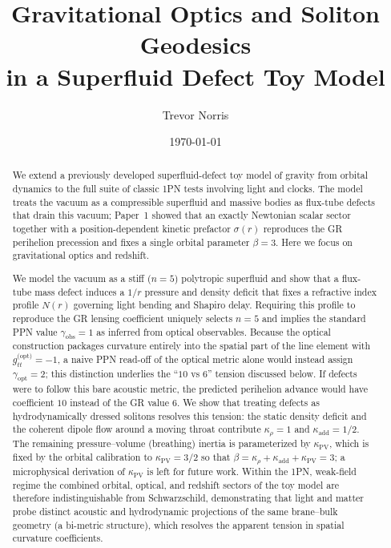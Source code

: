 \documentclass[11pt]{article}
\title{Gravitational Optics and Soliton Geodesics\\
in a Superfluid Defect Toy Model}
\author{Trevor Norris}
\date{\today}
\begin{document}
\maketitle

\begin{abstract}
We extend a previously developed superfluid-defect toy model of gravity from
orbital dynamics to the full suite of classic 1PN tests involving light and
clocks.  The model treats the vacuum as a compressible superfluid and massive
bodies as flux-tube defects that drain this vacuum; Paper~1 showed that an
exactly Newtonian scalar sector together with a position-dependent kinetic
prefactor $\sigma(r)$ reproduces the GR perihelion precession and fixes a
single orbital parameter $\beta=3$.  Here we focus on gravitational optics and
redshift.

We model the vacuum as a stiff ($n=5$) polytropic superfluid and show that a
flux-tube mass defect induces a $1/r$ pressure and density deficit that fixes a
refractive index profile $N(r)$ governing light bending and Shapiro delay.
Requiring this profile to reproduce the GR lensing coefficient uniquely selects
$n=5$ and implies the standard PPN value $\gamma_{\mathrm{obs}}=1$ as inferred
from optical observables.  Because the optical construction packages curvature
entirely into the spatial part of the line element with $g_{tt}^{\text{(opt)}}=-1$,
a naive PPN read-off of the optical metric alone would instead assign
$\gamma_{\text{opt}}=2$; this distinction underlies
the ``$10$ vs $6$'' tension discussed below.
If defects were to follow this bare acoustic metric, the predicted perihelion
advance would have coefficient $10$ instead of the GR value $6$.
We show that treating defects as hydrodynamically dressed solitons resolves
this tension: the static density deficit and the coherent dipole flow around a
moving throat contribute $\kappa_\rho = 1$ and $\kappa_{\mathrm{add}} = 1/2$.
The remaining pressure--volume (breathing) inertia is parameterized by
$\kappa_{\mathrm{PV}}$, which is fixed by the orbital calibration to
$\kappa_{\mathrm{PV}} = 3/2$ so that $\beta = \kappa_\rho + \kappa_{\mathrm{add}} +
\kappa_{\mathrm{PV}} = 3$; a microphysical derivation of $\kappa_{\mathrm{PV}}$ is
left for future work.
Within the 1PN, weak-field regime the combined orbital, optical, and redshift
sectors of the toy model are therefore indistinguishable from Schwarzschild,
demonstrating that light and matter probe distinct acoustic and hydrodynamic
projections of the same brane--bulk geometry (a bi-metric structure), which
resolves the apparent tension in spatial curvature coefficients.
\end{abstract}
\end{document}
